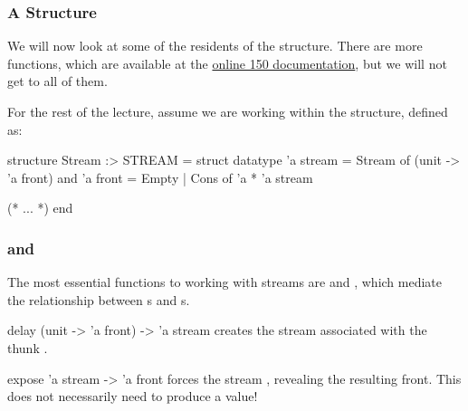 \documentclass[aspectratio=169]{beamer}
\begin{document}
\begin{frame}[fragile]
  \frametitle{A  Structure}

  We will now look at some of the residents of the  structure.
  There are more functions, which are available at the
  {\color{blue} \href{http://www.cs.cmu.edu/~15150/resources/libraries/stream.pdf}{online 150 documentation}},
  but we will not get to all of them.

  \pause
  \vspace{\fill}

  For the rest of the lecture, assume we are working within the 
  structure, defined as:

  \begin{codeblock}
    structure Stream :> STREAM =
      struct
        datatype 'a stream = Stream of (unit -> 'a front)
        and 'a front = Empty | Cons of 'a * 'a stream

        (* ... *)
      end
  \end{codeblock}
\end{frame}

\begin{frame}[fragile]
  \frametitle{ and }

  The most essential functions to working with streams are 
  and , which mediate the relationship between s and
  s.

  \pause
  \vspace{\fill}

  \spec
    {delay}
    {(unit -> 'a front) -> 'a stream}
    {}
    { creates the stream associated with the thunk .}

  \pause
  \vspace{\fill}

  \spec
    {expose}
    {'a stream -> 'a front}
    {}
    { forces the stream , revealing the resulting front.
    This does not necessarily need to produce a value!}
\end{frame}
\end{document}
